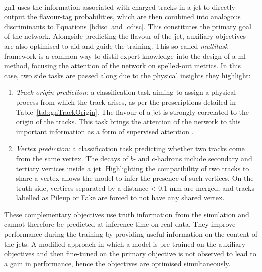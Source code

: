 \paragraph{}\gls{gn1} uses the information associated with charged tracks in a jet to directly output the flavour-tag probabilities, which are then combined into analogous discriminants to Equations \ref{bdisc} and \ref{cdisc}. This constitutes the primary goal of the network. Alongside predicting the flavour of the jet, auxiliary objectives are also optimised to aid and guide the training. This so-called \textit{multitask} framework is a common way to distil expert knowledge into the design of a \gls{ml} method, focusing the attention of the network on spelled-out metrics. In this case, two side tasks are passed along due to the physical insights they highlight:
\begin{enumerate}
\item \textit{Track origin prediction}: a classification task aiming to assign a physical process from which the track arises, as per the prescriptions detailed in Table~\ref{tab:gnTrackOrigin}. The flavour of a jet is strongly correlated to the origin of the tracks. This task brings the attention of the network to this important information as a form of supervised attention \cite{hwang2021selfsupervised}.
\item \textit{Vertex prediction}: a classification task predicting whether two tracks come from the same vertex. The decays of $b$- and $c$-hadrons include secondary and tertiary vertices inside a jet. Highlighting the compatibility of two tracks to share a vertex allows the model to infer the presence of such vertices. On the truth side, vertices separated by a distance < 0.1 mm are merged, and tracks labelled as Pileup or Fake are forced to not have any shared vertex.
\end{enumerate}
These complementary objectives use truth information from the simulation and cannot therefore be predicted at inference time on real data. They improve performance during the training by providing useful information on the content of the jets. A modified approach in which a model is pre-trained on the auxiliary objectives and then fine-tuned on the primary objective is not observed to lead to a gain in performance, hence the objectives are optimised simultaneously. \\

